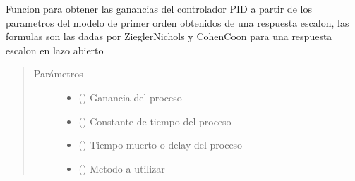 \documentclass[letterpaper,10pt,spanish]{sphinxmanual}
\begin{document}
\begin{fulllineitems}
\label{\detokenize{codigos/rutinas_PID:rutinas_PID.auto_tuning_method}}
Funcion para obtener las ganancias del controlador PID a partir de los parametros del modelo de primer orden obtenidos de una respuesta escalon, las formulas son las dadas por Ziegler\sphinxhyphen{}Nichols y Cohen\sphinxhyphen{}Coon para una respuesta escalon en lazo abierto
\begin{quote}\begin{description}
\item[{Parámetros}] \leavevmode\begin{itemize}
\item {} 
 () \textendash{} Ganancia del proceso

\item {} 
 () \textendash{} Constante de tiempo del proceso

\item {} 
 () \textendash{} Tiempo muerto o delay del proceso

\item {} 
 () \textendash{} Metodo a utilizar

\end{itemize}

\end{description}\end{quote}

\end{fulllineitems}

\end{document}
